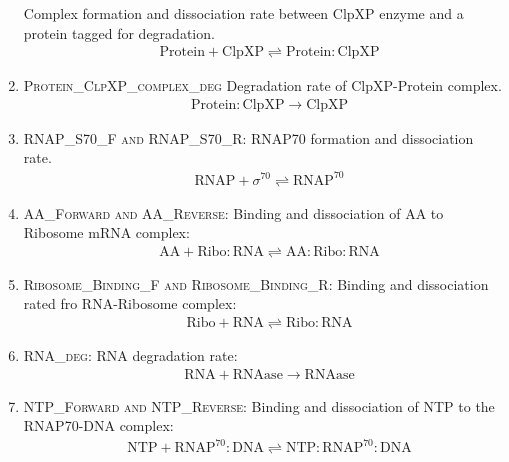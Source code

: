 \begin{enumerate}
        	Complex formation and dissociation rate between ClpXP enzyme and a protein tagged for degradation.
        	\begin{align}
        	& \mathrm{Protein} + \mathrm{ClpXP} \rightleftharpoons  \mathrm{Protein:ClpXP} 
        	\end{align}        	
        	\item \textsc{Protein\_ClpXP\_complex\_deg} 
        	Degradation rate of ClpXP-Protein complex.
        	\begin{align}
        	& \mathrm{Protein:ClpXP}  \rightarrow   \mathrm{ClpXP}
        	\end{align} 
        	\item \textsc{RNAP\_S70\_F and RNAP\_S70\_R}:
        	RNAP70 formation and dissociation rate.
        	\begin{align}
        	& \mathrm{RNAP} + \sigma^{70} \rightleftharpoons   \mathrm{RNAP^{70}}
        	\end{align}
        	\item \textsc{AA\_Forward and AA\_Reverse}:
        	Binding and dissociation of AA to Ribosome mRNA complex:
        	\begin{align}
        	& \mathrm{AA} + \mathrm{Ribo:RNA}  \rightleftharpoons   \mathrm{AA}:\mathrm{Ribo:RNA}
        	\end{align}
        	\item \textsc{Ribosome\_Binding\_F and Ribosome\_Binding\_R}: Binding and dissociation rated fro RNA-Ribosome complex:
        	\begin{align}
        	& \mathrm{Ribo} + \mathrm{RNA}  \rightleftharpoons   \mathrm{Ribo:RNA}
        	\end{align}
        	\item \textsc{RNA\_deg}: RNA degradation rate:
        	\begin{align}
        	& \mathrm{RNA} + \mathrm{RNAase}  \rightarrow   \mathrm{RNAase}
        	\end{align}
        	
        	\item \textsc{NTP\_Forward and NTP\_Reverse}:
        	Binding and dissociation of NTP to the RNAP70-DNA complex:
        	\begin{align}
        	& \mathrm{NTP} + \mathrm{RNAP^{70}}:\mathrm{DNA}  \rightleftharpoons   \mathrm{NTP}:\mathrm{RNAP^{70}}:\mathrm{DNA}
        	\end{align}
			\end{enumerate}		
